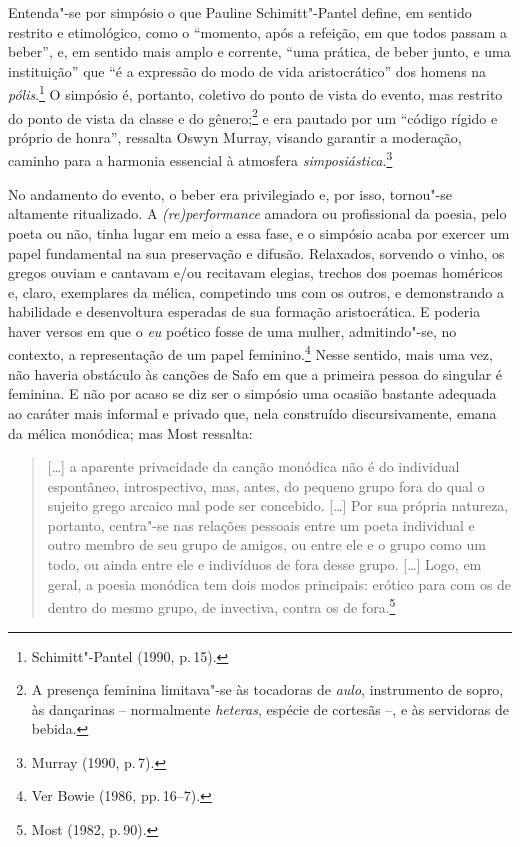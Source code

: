 Entenda"-se por simpósio o que Pauline Schimitt"-Pantel define, em
sentido restrito e etimológico, como o “momento, após a refeição, em que todos
passam a beber”, e, em sentido mais amplo e corrente, “uma prática, de beber
junto, e uma instituição” que “é a expressão do modo de vida aristocrático” dos
homens na \textit{pólis}.\footnote{ Schimitt"-Pantel (1990, p.\,15).} O simpósio
é, portanto, coletivo do ponto de vista do
evento, mas restrito do ponto de vista da classe e do gênero;\footnote{A presença
feminina limitava"-se às tocadoras de \textit{aulo}, instrumento de sopro, às
dançarinas -- normalmente \textit{heteras}, espécie de cortesãs --, e às servidoras de bebida.} e era pautado por um
“código rígido e próprio de honra”, ressalta Oswyn Murray, visando
garantir a moderação, caminho para a harmonia essencial à atmosfera
\textit{simposiástica}.\footnote{ Murray (1990, p.\,7).}

No andamento do evento, o beber era privilegiado e, por isso, tornou"-se
altamente ritualizado. A \textit{(re)performance} amadora ou profissional da
poesia, pelo poeta ou não, tinha lugar em meio a essa fase, e o simpósio acaba
por exercer um papel fundamental na sua preservação e difusão. Relaxados,
sorvendo o vinho, os gregos ouviam e cantavam e/ou recitavam elegias, trechos
dos poemas homéricos e, claro, exemplares da mélica, competindo uns com os
outros, e demonstrando a habilidade e desenvoltura esperadas de sua formação
aristocrática. E poderia haver
versos em que o \textit{eu} poético fosse de uma mulher, admitindo"-se, no contexto, a
representação de um papel feminino.\footnote{ Ver Bowie (1986, pp.\,16--7).}
Nesse sentido, mais uma vez, não haveria obstáculo às canções de Safo em que a primeira pessoa do singular é feminina. E não por acaso se diz ser o simpósio uma
ocasião bastante adequada ao caráter mais informal e privado que, nela construído discursivamente, emana da mélica monódica; mas Most ressalta:

\begin{quote}
{[}\ldots{}{]} a aparente privacidade da canção monódica não é do individual espontâneo,
introspectivo, mas, antes, do pequeno grupo fora do qual o sujeito grego
arcaico mal pode ser concebido. {[}\ldots{}{]} Por sua própria natureza, portanto,
centra"-se nas relações pessoais entre um poeta individual e outro membro de seu
grupo de amigos, ou entre ele e o grupo como um todo, ou ainda entre ele e
indivíduos de fora desse grupo. {[}\ldots{}{]} Logo, em geral, a poesia monódica tem
dois modos principais: erótico para com os de dentro do mesmo grupo, de
invectiva, contra os de fora.\footnote{ Most (1982, p.\,90).}
\end{quote}

